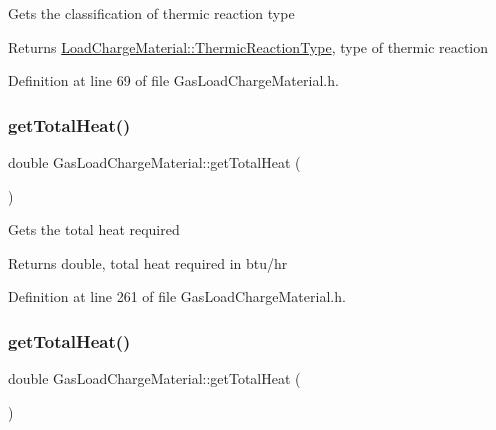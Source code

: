 Gets the classification of thermic reaction type \begin{DoxyReturn}{Returns}
\hyperlink{namespace_load_charge_material_a51d4263e865a5d86236622dd3fe23fd1}{Load\+Charge\+Material\+::\+Thermic\+Reaction\+Type}, type of thermic reaction 
\end{DoxyReturn}


Definition at line 69 of file Gas\+Load\+Charge\+Material.\+h.

\mbox{\label{class_gas_load_charge_material_a4f831537652ca09c4539982c626cc164}} 
\subsubsection{\texorpdfstring{get\+Total\+Heat()}{getTotalHeat()}\hspace{0.1cm}{\footnotesize\ttfamily [1/3]}}
{\footnotesize\ttfamily double Gas\+Load\+Charge\+Material\+::get\+Total\+Heat (\begin{DoxyParamCaption}{ }\end{DoxyParamCaption})\hspace{0.3cm}{\ttfamily [inline]}}

Gets the total heat required \begin{DoxyReturn}{Returns}
double, total heat required in btu/hr 
\end{DoxyReturn}


Definition at line 261 of file Gas\+Load\+Charge\+Material.\+h.

\mbox{\label{class_gas_load_charge_material_a4f831537652ca09c4539982c626cc164}} 
\subsubsection{\texorpdfstring{get\+Total\+Heat()}{getTotalHeat()}\hspace{0.1cm}{\footnotesize\ttfamily [2/3]}}
{\footnotesize\ttfamily double Gas\+Load\+Charge\+Material\+::get\+Total\+Heat (\begin{DoxyParamCaption}{ }\end{DoxyParamCaption})\hspace{0.3cm}{\ttfamily [inline]}}

